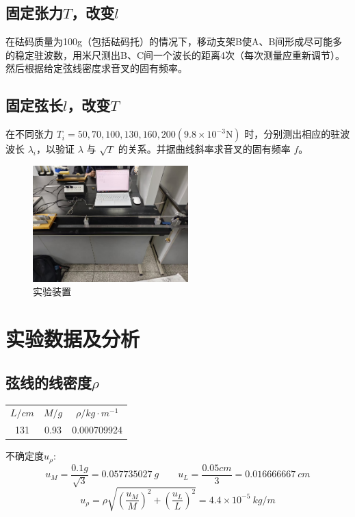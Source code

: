 \documentclass{article}
\begin{document}
\subsection{固定张力$T$，改变$l$}
在砝码质量为100g（包括砝码托）的情况下，移动支架B使A、B间形成尽可能多的稳定驻波数，用米尺测出B、C间一个波长的距离4次（每次测量应重新调节）。然后根据给定弦线密度求音叉的固有频率。 
\subsection{固定弦长$l$，改变$T$}
在不同张力 \(T_i = 50, 70, 100, 130, 160, 200 (9.8\times10^{-3} \mathrm{N})\) 时，分别测出相应的驻波波长 \(\lambda_i\)，以验证 \(\lambda\) 与 \(\sqrt{T}\) 的关系。并据曲线斜率求音叉的固有频率 \(f\)。

\begin{figure}[ht]

    \centering
    \includegraphics[width=6cm]{3.jpg} %
    \caption{实验装置}
\end{figure}

\section{实验数据及分析}
\subsection{弦线的线密度$\rho$}
\begin{table}[ht]
    \centering
    \begin{tabular}{ccc}
    \hline \hline
    $L/cm$ & $M/g$  & $\rho/ kg\cdot m^{-1}$   \\
    131  & 0.93 & 0.000709924 \\ \hline \hline
    \end{tabular}
\end{table}

不确定度$u_{\rho}$:
$$
u_M=\frac{0.1g}{\sqrt{3}}=0.057735027\ g \qquad u_L=\frac{0.05cm}{3}=0.016666667\ cm
$$
$$
u_\rho=\rho\sqrt{(\frac{u_M}{M})^2+(\frac{u_L}{L})^2}=4.4\times 10^{-5} \ kg/m
$$
\end{document}
